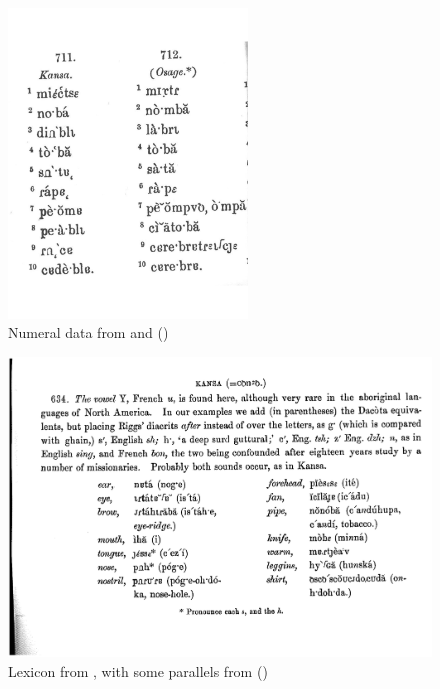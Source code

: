 \documentclass[output=paper]{LSP/langsci}
\begin{document}
\begin{figure}
\centering
\caption{Numeral data from  and  (\citealt[146, \S711, 712]{Haldeman1860})} \label{haldemannumerals}
\includegraphics[width=2.5in,angle=-2]{figures/GrantNumerals}
\end{figure}

\begin{figure}
\centering
\caption{Lexicon from , with some  parallels from \citet{Riggs1852}  (\citealt[135, \S634]{Haldeman1860})} \label{haldemanlexicon}
\includegraphics[width=5in]{figures/GrantKanzaWords}
\end{figure}
\end{document}
